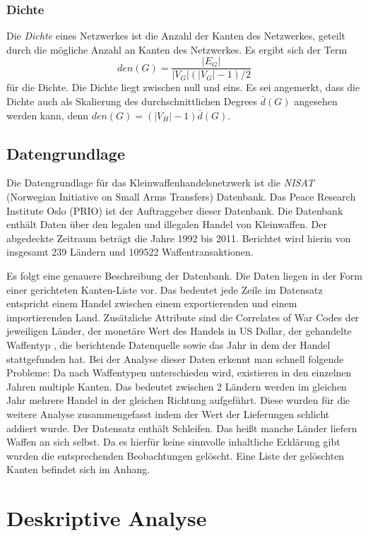 \documentclass[a4paper,ngerman,oneside,titlepage,bibliography=totoc,11pt]{scrreprt}
\begin{document}
\subsection{Dichte}
Die \emph{Dichte} eines Netzwerkes ist die Anzahl der Kanten des Netzwerkes, geteilt durch die mögliche Anzahl an Kanten des Netzwerkes. Es ergibt sich der Term $$den(G) = \frac{|E_G|}{|V_G|(|V_G|-1)/2}$$ für die Dichte. Die Dichte liegt zwischen null und eins. Es sei angemerkt, dass die Dichte auch als Skalierung des durchschnittlichen Degrees $\bar{d}(G)$ angesehen werden kann, denn $den(G) = (|V_H| - 1) \bar{d}(G)$.

\section{Datengrundlage}
Die Datengrundlage für das Kleinwaffenhandelsnetzwerk ist die \emph{NISAT} (Norwegian Initiative on Small Arms Transfers) Datenbank. Das Peace Research Institute Oslo (PRIO) ist der Auftraggeber dieser Datenbank. Die Datenbank enthält Daten über den legalen und illegalen Handel von Kleinwaffen. Der abgedeckte Zeitraum beträgt die Jahre 1992 bis 2011. Berichtet wird hierin von insgesamt 239 Ländern und 109522 Waffentransaktionen.

Es folgt eine genauere Beschreibung der Datenbank. Die Daten liegen in der Form einer gerichteten Kanten-Liste vor. Das bedeutet jede Zeile im Datensatz entspricht einem Handel zwischen einem exportierenden und einem importierenden Land. Zusätzliche Attribute sind die Correlates of War Codes der jeweiligen Länder, der monetäre Wert des Handels in US Dollar, der gehandelte Waffentyp , die berichtende Datenquelle sowie das Jahr in dem der Handel stattgefunden hat.
Bei der Analyse dieser Daten erkennt man schnell folgende Probleme:
Da nach Waffentypen unterschieden wird, existieren in den einzelnen Jahren multiple Kanten. Das bedeutet zwischen 2 Ländern werden im gleichen Jahr mehrere Handel in der gleichen Richtung aufgeführt. Diese wurden für die weitere Analyse zusammengefasst indem der Wert der Lieferungen schlicht addiert wurde.
Der Datensatz enthält Schleifen. Das heißt manche Länder liefern Waffen an sich selbst. Da es hierfür keine sinnvolle inhaltliche Erklärung gibt wurden die entsprechenden Beobachtungen gelöscht. Eine Liste der gelöschten Kanten befindet sich im Anhang.

\chapter{Deskriptive Analyse}
\end{document}
